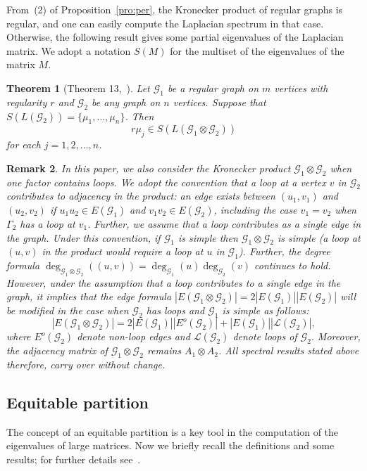 \documentclass[11pt]{article}
\def \G {{\mathcal G}}
\newtheorem{theorem}{Theorem}[section]
\newtheorem{rem}[theorem]{Remark}
\begin{document}
From~(2) of Proposition~\ref{pro:per}, the Kronecker product of regular graphs is regular, and one can easily compute the Laplacian spectrum in that case. Otherwise, the following result gives some partial eigenvalues of the Laplacian matrix. We adopt a notation $S(M)$ for the multiset of the eigenvalues of the matrix $M.$
 \begin{theorem}[Theorem 13,~\cite{barik}]\label{thm:klap}
Let $\G_1$ be a regular graph on $m$ vertices with regularity $r$ and $\G_2$ be any graph on $n$ vertices. Suppose that $S(L(\G_2)) = \{\mu_1, \dots, \mu_n\}$. Then
$$
     r\mu_j \in S(L(\G_1 \otimes \G_2))
$$
 for each $j = 1, 2, \dots, n$.
 \end{theorem}


\begin{rem}
    In this paper, we also consider the Kronecker product $\G_1 \otimes 
\G_2$ when one factor contains loops. We adopt the convention that a 
loop at a vertex $v$ in $\G_2$ contributes to adjacency in the product: 
an edge exists between $(u_1,v_1)$ and $(u_2,v_2)$ if $u_1u_2 \in 
E(\G_1)$ and $v_1v_2 \in E(\G_2)$, including the case $v_1 = 
v_2$ when $\Gamma_2$ has a loop at $v_1$. Further, we assume that a loop contributes as a single edge in the graph.
Under this convention, if $\G_1$ is simple then $\G_1 \otimes \G_2$ is 
simple (a loop at $(u,v)$ in the product would require a loop at $u$ in 
$\G_1$). Further, the degree formula $\deg_{\G_1 \otimes \G_2}((u,v)) = \deg_{\G_1}(u)\deg_{\G_2}(v)$ continues to hold. However, under the assumption that a loop contributes to a single edge in the graph, it implies that the edge formula $|E(\G_1\otimes \G_2)|=2|E(\G_1)||E(\G_2)|$ will be modified in the case when $\G_2$ has loops and $\G_1$ is simple as follows: 
\begin{equation}
    |E(\G_1\otimes \G_2)|=2|E(\G_1)||E^o(\G_2)|+|E(\G_1)||\mathcal{L}(\G_2)|,
\end{equation}
where $E^o(\G_2)$ denote non-loop edges and $\mathcal{L}(\G_2)$ denote loops of $\G_2.$ Moreover, the adjacency matrix of $\G_1 \otimes \G_2$ remains $A_1 \otimes A_2$. 
All spectral results stated above therefore, carry over without change.
\end{rem}
 
 

\subsection*{Equitable partition}
The concept of an equitable partition is a key tool in the computation of the eigenvalues of large matrices. Now we briefly recall the definitions and some results; for further details see~\cite{book}.
\end{document}
